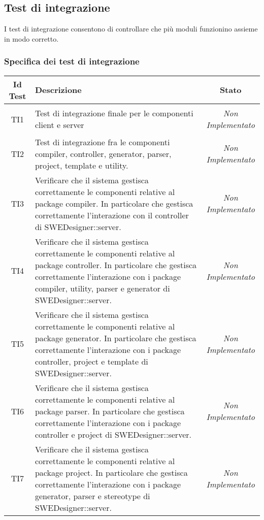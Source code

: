\subsection{Test di integrazione}
I test di integrazione consentono di controllare che più moduli funzionino assieme in modo corretto.
	
\subsubsection{Specifica dei test di integrazione}
\normalsize
\begin{longtable}{|c|>{}m{8cm}|c|}
\hline 
\textbf{Id Test} & \textbf{Descrizione} & \textbf{Stato}\\
\hline
\endhead
\hypertarget{TI1}{TI1} & Test di integrazione finale per le componenti client e server & \textit{Non Implementato}\\ \hline
\hypertarget{TI2}{TI2} & Test di integrazione fra le componenti compiler, controller, generator, parser, project, template e utility. & \textit{Non Implementato}\\ \hline
\hypertarget{TI3}{TI3} & Verificare che il sistema gestisca correttamente le componenti relative al package compiler. In particolare che gestisca correttamente l'interazione con il controller di SWEDesigner::server. & \textit{Non Implementato}\\ \hline
\hypertarget{TI4}{TI4} & Verificare che il sistema gestisca correttamente le componenti relative al package controller. In particolare che gestisca correttamente l'interazione con i package compiler, utility, parser e generator di SWEDesigner::server. & \textit{Non Implementato}\\ \hline
\hypertarget{TI5}{TI5} & Verificare che il sistema gestisca correttamente le componenti relative al package generator. In particolare che gestisca correttamente l'interazione con i package controller, project e template di SWEDesigner::server. & \textit{Non Implementato}\\ \hline
\hypertarget{TI6}{TI6} & Verificare che il sistema gestisca correttamente le componenti relative al package parser. In particolare che gestisca correttamente l'interazione con i package controller e project di SWEDesigner::server. & \textit{Non Implementato}\\ \hline
\hypertarget{TI7}{TI7} & Verificare che il sistema gestisca correttamente le componenti relative al package project. In particolare che gestisca correttamente l'interazione con i package generator, parser e stereotype di SWEDesigner::server. & \textit{Non Implementato}\\ \hline

\end{longtable}
